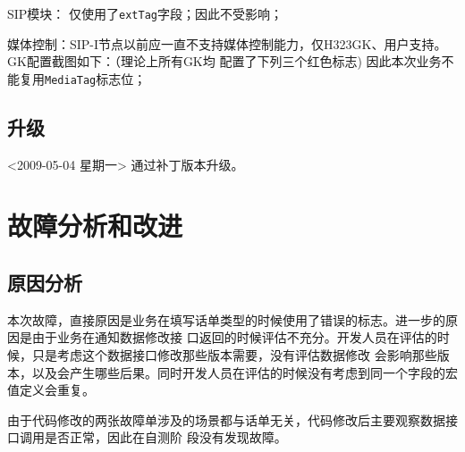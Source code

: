 \documentclass[12pt,a4paper,onecolumn]{article}
\begin{document}
SIP模块： 仅使用了\lstinline{extTag}字段；因此不受影响；

媒体控制：SIP-I节点以前应一直不支持媒体控制能力，仅H323GK、用户支持。GK配置截图如下：（理论上所有GK均
配置了下列三个红色标志) 因此本次业务不能复用\lstinline{MediaTag}标志位；



\subsection{升级}
<2009-05-04 星期一> 通过补丁版本升级。

\section{故障分析和改进}
\subsection{原因分析}
本次故障，直接原因是业务在填写话单类型的时候使用了错误的标志。进一步的原因是由于业务在通知数据修改接
口返回的时候评估不充分。开发人员在评估的时候，只是考虑这个数据接口修改那些版本需要，没有评估数据修改
会影响那些版本，以及会产生哪些后果。同时开发人员在评估的时候没有考虑到同一个字段的宏值定义会重复。

由于代码修改的两张故障单涉及的场景都与话单无关，代码修改后主要观察数据接口调用是否正常，因此在自测阶
段没有发现故障。
\end{document}
